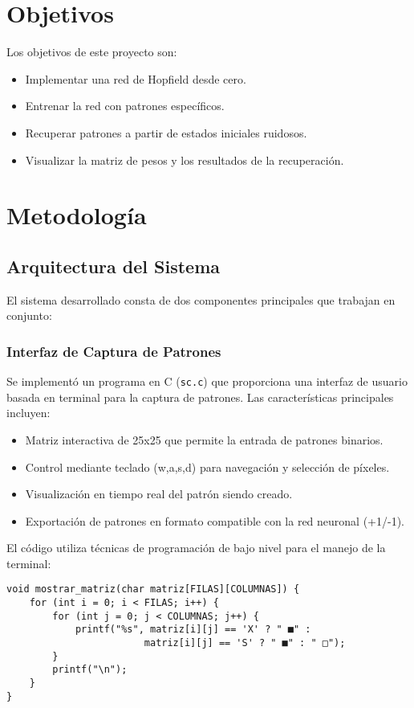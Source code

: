 \documentclass{article}
\begin{document}
\section{Objetivos}
Los objetivos de este proyecto son:
\begin{itemize}
    \item Implementar una red de Hopfield desde cero.
    \item Entrenar la red con patrones específicos.
    \item Recuperar patrones a partir de estados iniciales ruidosos.
    \item Visualizar la matriz de pesos y los resultados de la recuperación.
\end{itemize}

\section{Metodología}
\subsection{Arquitectura del Sistema}
El sistema desarrollado consta de dos componentes principales que trabajan en conjunto:

\subsubsection{Interfaz de Captura de Patrones}
Se implementó un programa en C (\texttt{sc.c}) que proporciona una interfaz de usuario basada en terminal para la captura de patrones. Las características principales incluyen:

\begin{itemize}
    \item Matriz interactiva de 25x25 que permite la entrada de patrones binarios.
    \item Control mediante teclado (w,a,s,d) para navegación y selección de píxeles.
    \item Visualización en tiempo real del patrón siendo creado.
    \item Exportación de patrones en formato compatible con la red neuronal (+1/-1).
\end{itemize}

El código utiliza técnicas de programación de bajo nivel para el manejo de la terminal:
\begin{verbatim}
void mostrar_matriz(char matriz[FILAS][COLUMNAS]) {
    for (int i = 0; i < FILAS; i++) {
        for (int j = 0; j < COLUMNAS; j++) {
            printf("%s", matriz[i][j] == 'X' ? " ■" : 
                        matriz[i][j] == 'S' ? " ■" : " □");
        }
        printf("\n");
    }
}
\end{verbatim}
\end{document}
